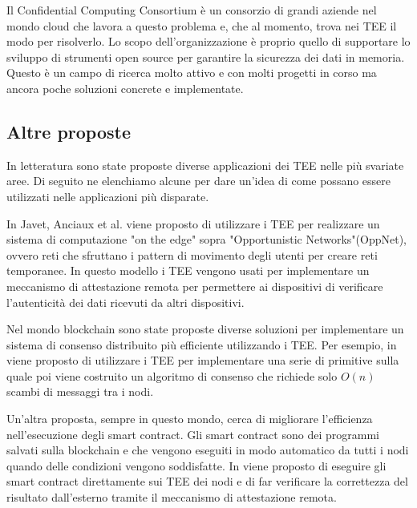 \documentclass[12pt,italian]{report}
\begin{document}
Il Confidential Computing Consortium\cite{confidential_computing_initiative}
è un consorzio di grandi aziende nel mondo cloud che lavora a questo problema
e, che al momento, trova nei TEE il modo per risolverlo.
Lo scopo dell'organizzazione è proprio quello di supportare lo sviluppo
di strumenti open source per garantire la sicurezza dei dati in memoria.
Questo è un campo di ricerca molto attivo e con molti progetti in corso ma
ancora poche soluzioni concrete e implementate.

\subsection{Altre proposte}
\label{subsec:altre-proposte}
In letteratura sono state proposte diverse applicazioni dei TEE nelle più
svariate aree. Di seguito ne elenchiamo alcune per dare un'idea di come
possano essere utilizzati nelle applicazioni più disparate.

\bigbreak \noindent

In Javet, Anciaux et al.\cite{teeuses_edgeletcomputing} viene proposto di
utilizzare i TEE per realizzare un sistema di computazione "on the edge" sopra
"Opportunistic Networks"(OppNet), ovvero reti che sfruttano i
pattern di movimento degli utenti per creare reti temporanee.
In questo modello i TEE vengono usati per implementare un meccanismo di
attestazione remota per permettere ai dispositivi di verificare l'autenticità
dei dati ricevuti da altri dispositivi.

\bigbreak \noindent

Nel mondo blockchain sono state proposte diverse soluzioni per implementare
un sistema di consenso distribuito più efficiente utilizzando i TEE.
Per esempio, in \cite{teeuses_blockchainconsent} viene proposto di utilizzare
i TEE per implementare una serie di primitive sulla quale poi viene
costruito un algoritmo di consenso che richiede solo $O(n)$ scambi di messaggi
tra i nodi.

Un'altra proposta, sempre in questo mondo, cerca di migliorare l'efficienza
nell'esecuzione degli smart contract.
Gli smart contract sono dei programmi salvati sulla blockchain e che vengono
eseguiti in modo automatico da tutti i nodi quando delle condizioni vengono
soddisfatte.
In \cite{teeuses_smartcontract} viene proposto di eseguire gli smart contract
direttamente sui TEE dei nodi e di far verificare la correttezza del risultato
dall'esterno tramite il meccanismo di attestazione remota.

\bigbreak \noindent
\end{document}
